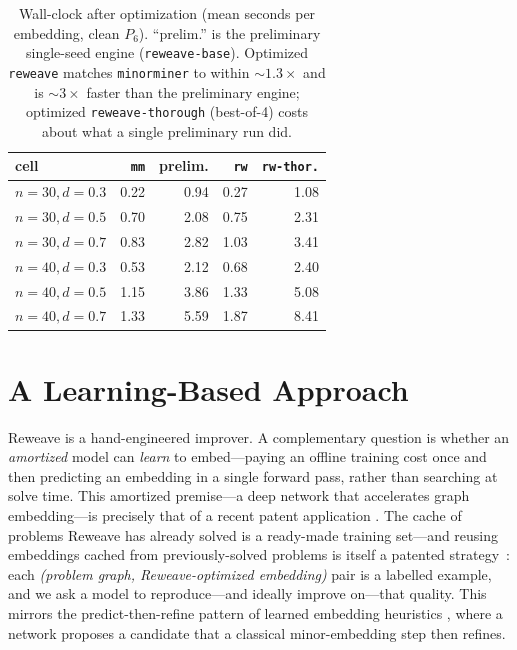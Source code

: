 \documentclass[acmsmall,anonymous,nonacm]{acmart}
\begin{document}
\begin{table}[t]
\caption{Wall-clock after optimization (mean seconds per embedding, clean $P_6$).
``prelim.'' is the preliminary single-seed engine (\texttt{reweave-base}).
Optimized \texttt{reweave} matches \texttt{minorminer} to within ${\sim}1.3\times$
and is ${\sim}3\times$ faster than the preliminary engine; optimized
\texttt{reweave-thorough} (best-of-4) costs about what a single preliminary run
did.}
\label{tab:opttime}
\small
\begin{tabular}{lrrrr}
\toprule
cell & \texttt{mm} & prelim. & \texttt{rw} & \texttt{rw-thor.} \\
\midrule
$n{=}30,d{=}0.3$ & 0.22 & 0.94 & 0.27 & 1.08 \\
$n{=}30,d{=}0.5$ & 0.70 & 2.08 & 0.75 & 2.31 \\
$n{=}30,d{=}0.7$ & 0.83 & 2.82 & 1.03 & 3.41 \\
$n{=}40,d{=}0.3$ & 0.53 & 2.12 & 0.68 & 2.40 \\
$n{=}40,d{=}0.5$ & 1.15 & 3.86 & 1.33 & 5.08 \\
$n{=}40,d{=}0.7$ & 1.33 & 5.59 & 1.87 & 8.41 \\
\bottomrule
\end{tabular}
\end{table}

\section{A Learning-Based Approach}
\label{sec:learning}

Reweave is a hand-engineered improver. A complementary question is whether an
\emph{amortized} model can \emph{learn} to embed---paying an offline training cost
once and then predicting an embedding in a single forward pass, rather than
searching at solve time. This amortized premise---a deep network that accelerates
graph embedding---is precisely that of a recent patent application
\cite{hyde2025dlembedding}. The cache of problems Reweave has already solved is a
ready-made training set---and reusing embeddings cached from previously-solved
problems is itself a patented strategy~\cite{brahm2021caching}: each \emph{(problem
graph, Reweave-optimized embedding)} pair is a labelled example, and we ask a model
to reproduce---and ideally improve on---that quality. This mirrors the
predict-then-refine pattern of learned embedding heuristics
\cite{ngo2024charme,nembrini2025ppo}, where a network proposes a candidate that a
classical minor-embedding step then refines.
\end{document}
